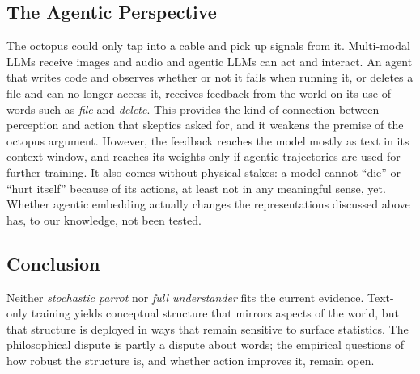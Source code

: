 \subsection{The Agentic Perspective}
The octopus could only tap into a cable and pick up signals from it. Multi-modal LLMs receive images and audio and agentic LLMs can act and interact. An agent that writes code and observes whether or not it fails when running it, or deletes a file and can no longer access it, receives feedback from the world on its use of words such as {\em file} and {\em delete}. This provides the kind of connection between perception and action that skeptics asked for, and it weakens the premise of the octopus argument. However, the feedback reaches the model mostly as text in its context window, and reaches its weights only if agentic trajectories are used for further training. It also comes without physical stakes: a model cannot ``die'' or ``hurt itself'' because of its actions, at least not in any meaningful sense, yet. Whether agentic embedding actually changes the representations discussed above has, to our knowledge, not been tested.

\subsection{Conclusion}
Neither \emph{stochastic parrot} nor \emph{full understander} fits the current evidence. Text-only training yields conceptual structure that mirrors aspects of the world, but that structure is deployed in ways that remain sensitive to surface statistics. The philosophical dispute is partly a dispute about words; the empirical questions of how robust the structure is, and whether action improves it, remain open.

